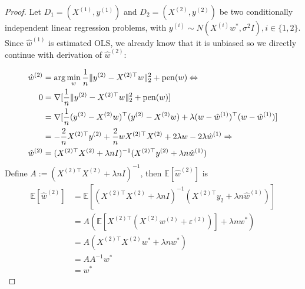 \begin{proof}
Let $D_1 = (X^{(1)}, y^{(1)})$ and $D_2 = (X^{(2)}, y^{(2)})$ be two conditionally independent linear regression problems, with $y^{(i)} \sim N(X^{(i)} w^*, \sigma^2 I), i \in \{1,2\}$.
Since $\hat{w}^{(1)}$ is estimated OLS, we already know that it is unbiased so we directly continue with derivation of $\hat{w}^{(2)}$:

\begin{equation}
	\begin{split}
		\hat{w}^{(2)} &= \arg\min_{w} \frac{1}{n}\lVert y^{(2)} - X^{(2)\top} w\rVert_2^2 + \operatorname{pen}(w)  \Leftrightarrow \\
		0 &= \nabla [\frac{1}{n}\lVert y^{(2)} - X^{(2)\top} w\rVert_2^2 + \operatorname{pen}(w)] \\
		&= \nabla [\frac{1}{n} (y^{(2)} - X^{(2)}w)^\top (y^{(2)} - X^{(2)}w) + \lambda(w - \hat{w}^{(1)})^\top (w - \hat{w}^{(1)})] \\
		&= -\frac{2}{n} X^{(2)\top} y^{(2)} + \frac{2}{n} wX^{(2)\top} X^{(2)} + 2\lambda w - 2\lambda \hat{w}^{(1)} \Rightarrow \\
		\hat{w}^{(2)} &= (X^{(2)\top} X^{(2)}+\lambda n I)^{-1}(X^{(2)\top} y^{(2)} +\lambda n \hat{w}^{(1)})
	\end{split}
\end{equation}
Define $A := (X^{(2)\top} X^{(2)}+\lambda n I)^{-1}$, then $\mathbb{E}[\hat{w}^{(2)}]$ is
\begin{equation}
	\begin{split}
		\mathbb{E}[\hat{w}^{(2)}] &= \mathbb{E}[(X^{(2)\top} X^{(2)}+\lambda n I)^{-1}(X^{(2)\top} y_2 +\lambda n \hat{w}^{(1)})] \\
		&= A \left( \mathbb{E}[X^{(2)\top}(X^{(2)} w^{(2)} + \varepsilon^{(2)})]  + \lambda n w^* \right) \\
		&= A (X^{(2)\top} X^{(2)}w^* + \lambda n w^* ) \\
		&= A A^{-1} w^* \\
		&= w^*
	\end{split}
\end{equation}
\end{proof}